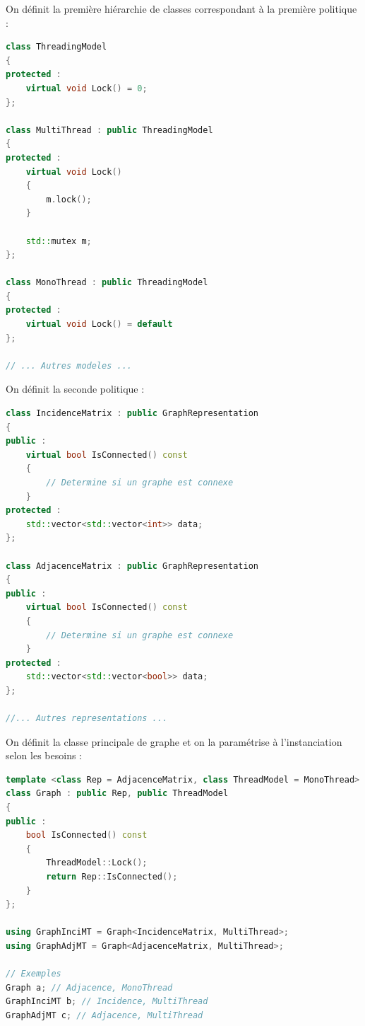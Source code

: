 On définit la première hiérarchie de classes correspondant à la première politique :
\begin{lstlisting}[label=policy_1,caption=Définition de la première politique,language=C++]
class ThreadingModel 
{
protected :
    virtual void Lock() = 0;
};

class MultiThread : public ThreadingModel
{
protected :
    virtual void Lock()
    {
        m.lock();
    }
    
    std::mutex m;
};

class MonoThread : public ThreadingModel
{
protected :
    virtual void Lock() = default
};

// ... Autres modeles ...
\end{lstlisting}

On définit la seconde politique :
\begin{lstlisting}[label=policy_2,caption=Définition de la seconde politique,language=C++]
class IncidenceMatrix : public GraphRepresentation
{
public :
    virtual bool IsConnected() const
    {
        // Determine si un graphe est connexe
    }
protected :
    std::vector<std::vector<int>> data;
};

class AdjacenceMatrix : public GraphRepresentation
{
public :
    virtual bool IsConnected() const
    {
        // Determine si un graphe est connexe
    }
protected :
    std::vector<std::vector<bool>> data;
};

//... Autres representations ...
\end{lstlisting}

On définit la classe principale de graphe et on la paramétrise à l'instanciation selon les besoins :
\begin{lstlisting}[label=policy_3,caption=Illustration de la paramétrisation,language=C++]
template <class Rep = AdjacenceMatrix, class ThreadModel = MonoThread>
class Graph : public Rep, public ThreadModel
{
public :
    bool IsConnected() const
    {
        ThreadModel::Lock();
        return Rep::IsConnected();
    }
};

using GraphInciMT = Graph<IncidenceMatrix, MultiThread>;
using GraphAdjMT = Graph<AdjacenceMatrix, MultiThread>;

// Exemples
Graph a; // Adjacence, MonoThread
GraphInciMT b; // Incidence, MultiThread
GraphAdjMT c; // Adjacence, MultiThread

\end{lstlisting}

